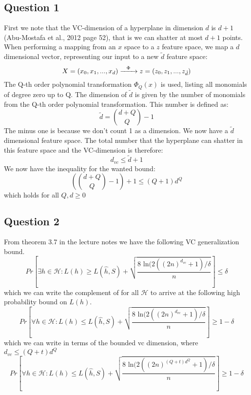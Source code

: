 \documentclass{article}
\begin{document}
\subsection{Question 1}
First we note that the VC-dimension of a hyperplane in dimension $d$ is $d+1$ (Abu-Mostafa et al., 2012 page 52), that is we can shatter at most $d+1$ points. 
When performing a mapping from an $x$ space to a $z$ feature space, we map a $d$ dimensional vector, representing our input to a new $\tilde{d}$ feature space:
$$
X = (x_0,x_1,...,x_d) \xrightarrow{\text{  \hspace{0.15cm}} \Phi \text{  \hspace{0.15cm}}} z = (z_0,z_1,...,z_{\tilde{d} })
$$
The Q-th order polynomial transformation $\Phi_Q(x)$ is used, listing all monomials of degree zero up to Q. The dimension of $\tilde{d}$ is given by the number of monomials from the Q-th order polynomial transformation. This number is defined as:
\begin{equation}
\tilde{d} = \binom{d+Q}{Q}-1
\end{equation}
The minus one is because we don't count 1 as a dimension.
We now have a $\tilde{d}$ dimensional feature space. The total number that the hyperplane can shatter in this feature space and the VC-dimension is therefore:
\begin{equation}
d_{vc} \leq  \tilde{d} + 1
\end{equation}
We now have the inequality for the wanted bound:
\begin{equation}
\left( \binom{d+Q}{Q}-1 \right) + 1 \leq (Q+1)d^Q
\end{equation}
which holds for all $Q,d \geq 0$
\subsection{Question 2}
From theorem 3.7 in the lecture notes we have the following VC generalization bound.
\begin{equation}
Pr \left[ \exists h \in \mathcal{H}: L(h) \geq L(\hat{h},S)+
\sqrt{ \dfrac{8 \text{ ln} (2((2n)^{d_{vc}}+1) / \delta}{n}} \right] \leq \delta 
\end{equation}
which we can write the complement of for all $\mathcal{H}$ to arrive at the following high probability bound on $L(h)$.
\begin{equation}
Pr \left[ \forall h \in \mathcal{H}: L(h) \leq L(\hat{h},S)+
\sqrt{ \dfrac{8 \text{ ln} (2((2n)^{d_{vc}}+1) / \delta}{n}} \right] \geq 1- \delta 
\end{equation}
which we can write in terms of the bounded vc dimension, where $d_{vc} \leq (Q+t)d^Q$
\begin{equation}
Pr \left[ \forall h \in \mathcal{H}: L(h) \leq L(\hat{h},S)+
\sqrt{ \dfrac{8 \text{ ln} (2((2n)^{(Q+t)d^Q}+1) / \delta}{n}} \right] \geq 1- \delta 
\end{equation}
\end{document}
